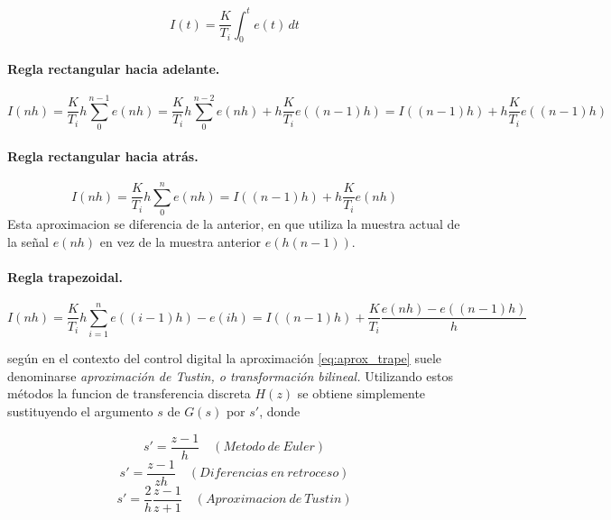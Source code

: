 \documentclass[10pt,conference,a4paper,onecolumn]{article}%
\begin{document}
\begin{equation}
I(t)=\frac{K}{T_i}\int_0^t e(t) \,dt
\label{eq:int_var}
\end{equation}  
  
  \paragraph{Regla rectangular hacia adelante.} 
  
  \begin{equation}
  I(nh)=\frac{K}{T_i}h \sum_0^{n-1}e(nh)= \frac{K}{T_i}h \sum_0^{n-2}e(nh) + h\frac{K}{T_i} e((n-1)h)=I((n-1)h)+  h\frac{K}{T_i} e((n-1)h)
  \end{equation}
  
  \paragraph{Regla rectangular hacia atrás.} 
  \begin{equation}
  I(nh)=\frac{K}{T_i}h \sum_0^{n}e(nh)=I((n-1)h)+  h\frac{K}{T_i} e(nh)
  \end{equation}
  Esta aproximacion se diferencia de la anterior, en que utiliza la muestra actual de la señal $e(nh)$ en vez de la muestra anterior $e(h(n-1))$.
  
  \paragraph{Regla trapezoidal.} 
  
  \begin{equation}
  I(nh)=\frac{K}{T_i}h \sum_{i=1}^{n}e((i-1)h)-e(ih)=I((n-1)h)+  \frac{K}{T_i} \frac{e(nh) -e((n-1)h)}{h}
  \label{eq:aprox_trape} 
  \end{equation}
  
  según \cite{astrom} en el contexto del control digital la aproximación \ref{eq:aprox_trape} suele denominarse \textit{aproximación de Tustin, o transformación bilineal.} Utilizando estos métodos la funcion de transferencia discreta $H(z)$ se obtiene simplemente sustituyendo el argumento $s$ de $G(s)$ por $s'$, donde
  
  \begin{equation}
  s'=\frac{z-1}{h} \quad (Metodo\ de\ Euler)
\end{equation}   
  \begin{equation}
  s'=\frac{z-1}{zh} \quad (Diferencias\ en\ retroceso)
\end{equation}   
\begin{equation}
  s'=\frac{2}{h} \frac{z-1}{z+1} \quad (Aproximacion\ de\ Tustin)
\end{equation}  
\end{document}
